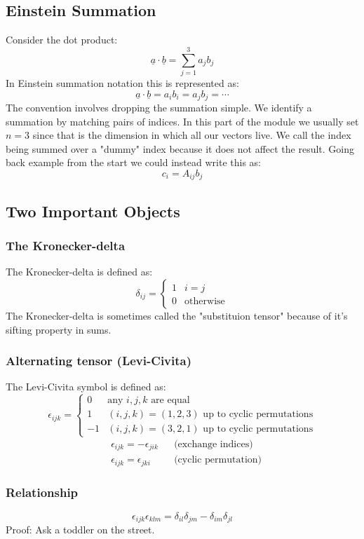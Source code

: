 \documentclass[12pt]{article}
\begin{document}
\subsection{Einstein Summation}
Consider the dot product:
\[\underline{a}\cdot \underline{b}=\sum^3_{j=1}a_jb_j\]
In Einstein summation notation this is represented as:
\[\underline{a}\cdot\underline{b}=a_ib_i=a_jb_j=\cdots\]
The convention involves dropping the summation simple. We identify a summation by matching pairs of indices. In this part of the module we usually set \(n=3\) since that is the dimension in which all our vectors live. We call the index being summed over a "dummy" index because it does not affect the result. Going back example from the start we could instead write this as:
\[c_i=A_{ij}b_j\]
\subsection{Two Important Objects}
\subsubsection{The Kronecker-delta}
The Kronecker-delta is defined as:
\[\delta_{ij}=\begin{cases}
    1 & i=j \\
    0 & \text{otherwise}
\end{cases}\]
The Kronecker-delta is sometimes called the "substituion tensor" because of it's sifting property in sums.
\subsubsection{Alternating tensor (Levi-Civita)}
The Levi-Civita symbol is defined as:
\[\epsilon_{ijk}=\begin{cases}
    0 & \text{any }i,j,k \text{ are equal} \\
    1 & (i,j,k)=(1,2,3) \text{ up to cyclic permutations} \\
    -1 & (i,j,k)=(3,2,1) \text{ up to cyclic permutations}
\end{cases}\]
\begin{align*}
    &\epsilon_{ijk}=-\epsilon_{jik} && \text{(exchange indices)} \\
    &\epsilon_{ijk}=\epsilon_{jki} && \text{(cyclic permutation)}
\end{align*}
\subsubsection{Relationship}
\[\epsilon_{ijk}\epsilon_{klm}=\delta_{il}\delta_{jm}-\delta_{im}\delta_{jl}\]
Proof: Ask a toddler on the street.
\end{document}
